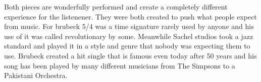 \documentclass{article}
\begin{document}
Both pieces are wonderfully performed and create a completely different
experience for the listenener. They were both created to push what people expect
from music. For brubeck 5/4 was a time signature rarely used by anyone and his
use of it was called revolutionary by some. Meanwhile Sachel studios took a jazz
standard and played it in a style and genre that nobody was expecting them to
use. Brubeck created a hit single that is famous even today after 50 years and
his song has been played by many different musicians from The Simpsons to a
Pakistani Orchestra.
\end{document}
